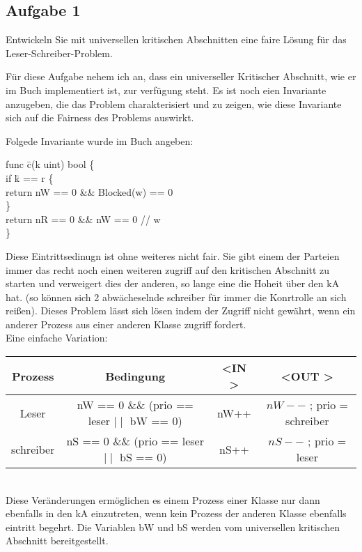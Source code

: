\subsection*{Aufgabe 1}
Entwickeln Sie mit universellen kritischen Abschnitten eine faire Lösung für das Leser-Schreiber-Problem.


Für diese Aufgabe nehem ich an, dass ein universeller Kritischer Abschnitt, wie er im Buch implementiert ist, zur verfügung steht. Es ist noch eien Invariante anzugeben, die das Problem charakterisiert und zu zeigen, wie diese Invariante sich auf die Fairness des Problems auswirkt.

Folgede Invariante wurde im Buch angeben:
\begin{tabbing}
func \=c(k uint) bool \{ \\
\>	if \= k == r  \{ \\
\>	\>	return nW == 0 \&\& Blocked(w) == 0 \\
\>	\} \\
\>	return nR == 0 \&\& nW == 0 // w \\
\} \\

\end{tabbing}

Diese Eintrittsedinugn ist ohne weiteres nicht fair. Sie gibt einem der Parteien immer das recht noch einen weiteren zugriff auf den kritischen Abschnitt zu starten und verweigert dies der anderen, so lange eine die Hoheit über den kA hat. (so können sich 2 abwächeselnde schreiber für immer die Konrtrolle an sich reißen). 
Dieses Problem lässt sich lösen indem der Zugriff nicht gewährt, wenn ein anderer Prozess aus einer anderen Klasse zugriff fordert. 
\\
Eine einfache Variation:
\\

\begin{tabular}{ c | c | c | c }
	Prozess  	& Bedingung &  \textless IN \textgreater & \textless OUT \textgreater \\
	\hline
	Leser		&	nW == 0 \&\& (prio == leser $\mid \mid$ bW == 0) & 	nW++		&	$nW --$ ; prio = schreiber		\\
	schreiber		&	nS == 0 \&\& (prio == leser $\mid \mid$ bS == 0) & 	nS++		&	$nS --$ ; prio = leser \\		

	
\end{tabular}
\\

Diese Veränderungen ermöglichen es einem Prozess einer Klasse nur dann ebenfalls in den kA einzutreten, wenn kein Prozess der anderen Klasse ebenfalls eintritt begehrt. Die Variablen bW und bS werden vom universellen kritischen Abschnitt bereitgestellt. 